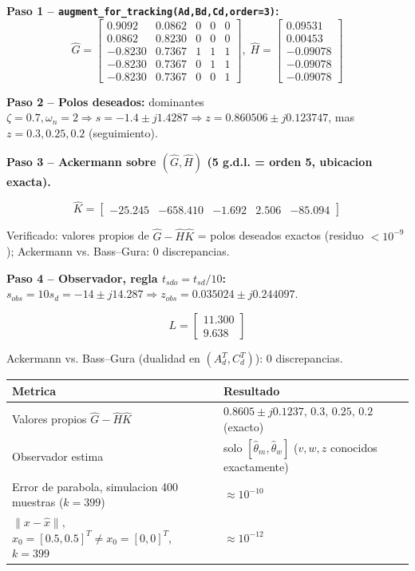 \documentclass[11pt]{article}
\begin{document}
\textbf{Paso 1 -- \texttt{augment\_for\_tracking(Ad,Bd,Cd,order=3)}:}
\begin{equation}
\hat G=\begin{bmatrix}0.9092&0.0862&0&0&0\\0.0862&0.8230&0&0&0\\
-0.8230&0.7367&1&1&1\\-0.8230&0.7367&0&1&1\\-0.8230&0.7367&0&0&1\end{bmatrix},\;
\hat H=\begin{bmatrix}0.09531\\0.00453\\-0.09078\\-0.09078\\-0.09078\end{bmatrix}
\end{equation}

\textbf{Paso 2 -- Polos deseados:} dominantes $\zeta=0.7,\omega_n=2\Rightarrow
s=-1.4\pm j1.4287\Rightarrow z=0.860506\pm j0.123747$, mas $z=0.3,0.25,0.2$ (seguimiento).

\textbf{Paso 3 -- Ackermann sobre $(\hat G,\hat H)$ (5 g.d.l. = orden 5, ubicacion exacta).}
\begin{resultbox}
\begin{equation}
\hat K=\begin{bmatrix}-25.245&-658.410&-1.692&2.506&-85.094\end{bmatrix}
\end{equation}
\end{resultbox}
Verificado: valores propios de $\hat G-\hat H\hat K$ = polos deseados exactos
(residuo $<10^{-9}$); Ackermann vs. Bass--Gura: 0 discrepancias.

\textbf{Paso 4 -- Observador, regla $t_{sdo}=t_{sd}/10$:} $s_{obs}=10s_d=-14\pm j14.287
\Rightarrow z_{obs}=0.035024\pm j0.244097$.
\begin{resultbox}
\begin{equation}
L=\begin{bmatrix}11.300\\9.638\end{bmatrix}
\end{equation}
\end{resultbox}
Ackermann vs. Bass--Gura (dualidad en $(A_d^T,C_d^T)$): 0 discrepancias.

\begin{center}
\begin{tabular}{@{}ll@{}}
\toprule
Metrica & Resultado \\
\midrule
Valores propios $\hat G-\hat H\hat K$ & $0.8605{\pm}j0.1237,\,0.3,\,0.25,\,0.2$ (exacto) \\
Observador estima & solo $[\hat\theta_m,\hat\theta_w]$ ($v,w,z$ conocidos exactamente) \\
Error de parabola, simulacion 400 muestras ($k=399$) & $\approx 10^{-10}$ \\
$\|x-\hat x\|$, $\hat x_0=[0.5,0.5]^T\neq x_0=[0,0]^T$, $k=399$ & $\approx 10^{-12}$ \\
\bottomrule
\end{tabular}
\end{center}
\end{document}
